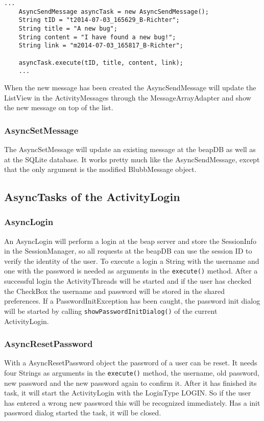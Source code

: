 \documentclass[12pt,a4paper,oneside]{report}
\newcommand{\code}[1]{\lstinline{#1}}
\begin{document}
\begin{lstlisting}[caption=AsyncSendMessage example, label=lst:AsyncSendMsg]
	...
	AsyncSendMessage asyncTask = new AsyncSendMessage();
	String tID = "t2014-07-03_165629_B-Richter";
	String title = "A new bug";
	String content = "I have found a new bug!";
	String link = "m2014-07-03_165817_B-Richter";
	
	asyncTask.execute(tID, title, content, link);	
	...
\end{lstlisting}

When the new message has been created the AsyncSendMessage will update the ListView in the ActivityMessages through the MessageArrayAdapter and show the new message on top of the list.

\subsubsection{AsyncSetMessage}
The AsyncSetMessage will update an existing message at the beapDB as well as at the SQLite database. It works pretty much like the AsyncSendMessage, except that the only argument is the modified BlubbMessage object. 

\subsection{AsyncTasks of the ActivityLogin}\label{subsec:AsyncLogin}
\subsubsection{AsyncLogin}
An AsyncLogin will perform a login at the beap server and store the SessionInfo in the SessionManager, so all requests at the beapDB can use the session ID to verify the identity of the user. To execute a login a String with the username and one with the password is needed as arguments in the \code{execute()} method.
After a successful login the ActivityThreads will be started and if the user has checked the CheckBox the username and password will be stored in the shared preferences. If a PasswordInitException has been caught, the password init dialog will be started by calling \code{showPasswordInitDialog()} of the current ActivityLogin. 
\subsubsection{AsyncResetPassword}
With a AsyncResetPassword object the password of a user can be reset. It needs four Strings as arguments in the \code{execute()} method, the username, old password, new password and the new password again to confirm it. After it has finished its task, it will start the ActivityLogin with the LoginType LOGIN. So if the user has entered a wrong new password this will be recognized immediately. Has a init password dialog started the task, it will be closed.
\end{document}
